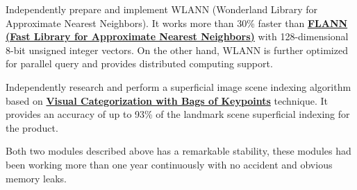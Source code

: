 \documentclass[]{deedy-resume-openfont}
\begin{document}
\begin{minipage}[t]{0.66\textwidth}
\begin{tightemize}
\item Independently prepare and implement WLANN (Wonderland Library for Approximate Nearest Neighbors). It works more than 30\% faster than \textbf{\href{http://www.cs.ubc.ca/research/flann}{FLANN (Fast Library for Approximate Nearest Neighbors)}} with 128-dimensional 8-bit unsigned integer vectors. On the other hand, WLANN is further optimized for parallel query and provides distributed computing support.
\item Independently research and perform a superficial image scene indexing algorithm based on \textbf{\href{https://people.eecs.berkeley.edu/~efros/courses/AP06/Papers/csurka-eccv-04.pdf}{Visual Categorization with Bags of Keypoints}} technique. It provides an accuracy of up to 93\% of the landmark scene superficial indexing for the product.
\item Both two modules described above has a remarkable stability, these modules had been working more than one year continuously with no accident and obvious memory leaks.
\end{tightemize}
\sectionsep




\end{minipage}
\end{document}
